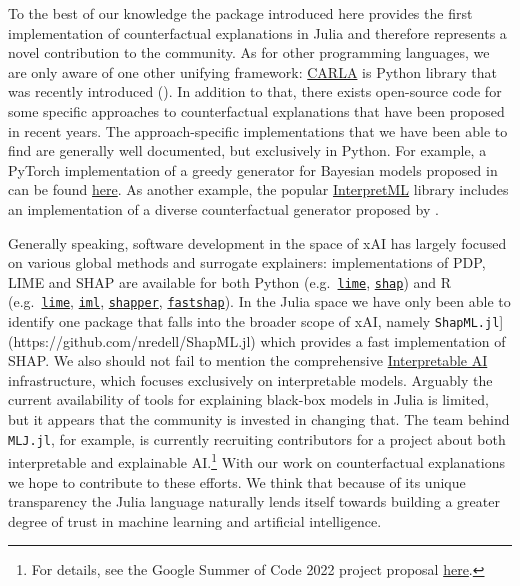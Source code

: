 \documentclass[
  letterpaper,
  DIV=11,
  numbers=noendperiod]{scrartcl}
\begin{document}
To the best of our knowledge the package introduced here provides the
first implementation of counterfactual explanations in Julia and
therefore represents a novel contribution to the community. As for other
programming languages, we are only aware of one other unifying
framework:
\href{https://carla-counterfactual-and-recourse-library.readthedocs.io/en/latest/?badge=latest}{CARLA}
is Python library that was recently introduced
(\cite{pawelczyk2021carla}). In addition to that, there exists
open-source code for some specific approaches to counterfactual
explanations that have been proposed in recent years. The
approach-specific implementations that we have been able to find are
generally well documented, but exclusively in Python. For example, a
PyTorch implementation of a greedy generator for Bayesian models
proposed in \cite{schut2021generating} can be found
\href{https://github.com/oscarkey/explanations-by-minimizing-uncertainty}{here}.
As another example, the popular
\href{https://github.com/interpretml}{InterpretML} library includes an
implementation of a diverse counterfactual generator proposed by
\cite{mothilal2020explaining}.

Generally speaking, software development in the space of xAI has largely
focused on various global methods and surrogate explainers:
implementations of PDP, LIME and SHAP are available for both Python
(e.g.~\href{https://github.com/marcotcr/lime}{\texttt{lime}},
\href{https://github.com/slundberg/shap}{\texttt{shap}}) and R
(e.g.~\href{https://cran.r-project.org/web/packages/lime/index.html}{\texttt{lime}},
\href{https://cran.r-project.org/web/packages/lime/index.html}{\texttt{iml}},
\href{https://modeloriented.github.io/shapper/}{\texttt{shapper}},
\href{https://github.com/bgreenwell/fastshap}{\texttt{fastshap}}). In
the Julia space we have only been able to identify one package that
falls into the broader scope of xAI, namely
\texttt{ShapML.jl}{]}(https://github.com/nredell/ShapML.jl) which
provides a fast implementation of SHAP. We also should not fail to
mention the comprehensive
\href{https://docs.interpretable.ai/stable/IAIBase/data/}{Interpretable
AI} infrastructure, which focuses exclusively on interpretable models.
Arguably the current availability of tools for explaining black-box
models in Julia is limited, but it appears that the community is
invested in changing that. The team behind \texttt{MLJ.jl}, for example,
is currently recruiting contributors for a project about both
interpretable and explainable AI.\footnote{For details, see the Google
  Summer of Code 2022 project proposal
  \href{https://julialang.org/jsoc/gsoc/MLJ/\#interpretable_machine_learning_in_julia}{here}.}
With our work on counterfactual explanations we hope to contribute to
these efforts. We think that because of its unique transparency the
Julia language naturally lends itself towards building a greater degree
of trust in machine learning and artificial intelligence.
\end{document}
